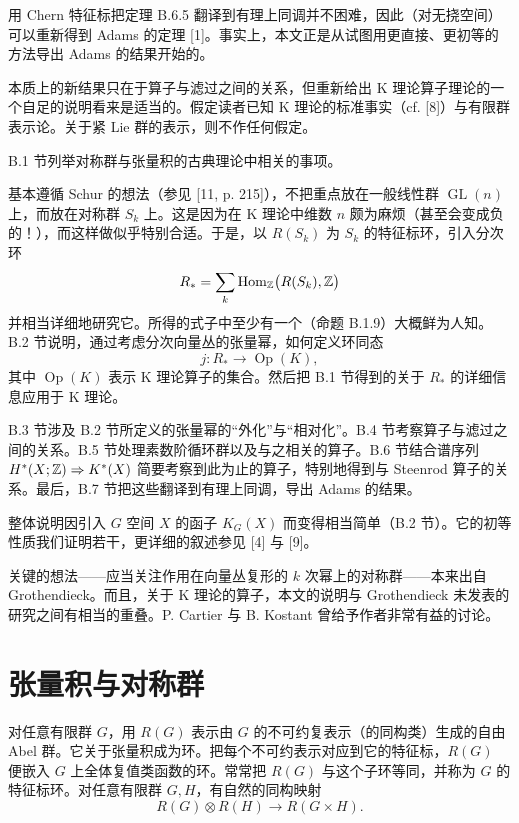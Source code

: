 用 Chern 特征标把定理 B.6.5 翻译到有理上同调并不困难，因此（对无挠空间）可以重新得到 Adams 的定理 [1]。事实上，本文正是从试图用更直接、更初等的方法导出 Adams 的结果开始的。

本质上的新结果只在于算子与滤过之间的关系，但重新给出 K 理论算子理论的一个自足的说明看来是适当的。假定读者已知 K 理论的标准事实（cf. [8]）与有限群表示论。关于紧 Lie 群的表示，则不作任何假定。

B.1 节列举对称群与张量积的古典理论中相关的事项。

基本遵循 Schur 的想法（参见 [11, p. 215]），不把重点放在一般线性群 $\operatorname{GL}(n)$ 上，而放在对称群 $S_k$ 上。这是因为在 K 理论中维数 $n$ 颇为麻烦（甚至会变成负的！），而这样做似乎特别合适。于是，以 $R(S_k)$ 为 $S_k$ 的特征标环，引入分次环
\[
  R_* = \sum_k \operatorname{Hom}_{\mathbb{Z}}\bigl(R(S_k),\mathbb{Z}\bigr)
\]
并相当详细地研究它。所得的式子中至少有一个（命题 B.1.9）大概鲜为人知。B.2 节说明，通过考虑分次向量丛的张量幂，如何定义环同态
\[
  j\colon R_*\longrightarrow \operatorname{Op}(K),
\]
其中 $\operatorname{Op}(K)$ 表示 K 理论算子的集合。然后把 B.1 节得到的关于 $R_*$ 的详细信息应用于 K 理论。

B.3 节涉及 B.2 节所定义的张量幂的“外化”与“相对化”。B.4 节考察算子与滤过之间的关系。B.5 节处理素数阶循环群以及与之相关的算子。B.6 节结合谱序列 $H^*(X;\mathbb{Z})\Rightarrow K^*(X)$ 简要考察到此为止的算子，特别地得到与 Steenrod 算子的关系。最后，B.7 节把这些翻译到有理上同调，导出 Adams 的结果。

整体说明因引入 $G$ 空间 $X$ 的函子 $K_G(X)$ 而变得相当简单（B.2 节）。它的初等性质我们证明若干，更详细的叙述参见 [4] 与 [9]。

关键的想法——应当关注作用在向量丛复形的 $k$ 次幂上的对称群——本来出自 Grothendieck。而且，关于 K 理论的算子，本文的说明与 Grothendieck 未发表的研究之间有相当的重叠。P. Cartier 与 B. Kostant 曾给予作者非常有益的讨论。

\section{张量积与对称群}


对任意有限群 $G$，用 $R(G)$ 表示由 $G$ 的不可约复表示（的同构类）生成的自由 Abel 群。它关于张量积成为环。把每个不可约表示对应到它的特征标，$R(G)$ 便嵌入 $G$ 上全体复值类函数的环。常常把 $R(G)$ 与这个子环等同，并称为 $G$ 的特征标环。对任意有限群 $G,H$，有自然的同构映射
\[
  R(G)\otimes R(H)\longrightarrow R(G\times H).
\]

